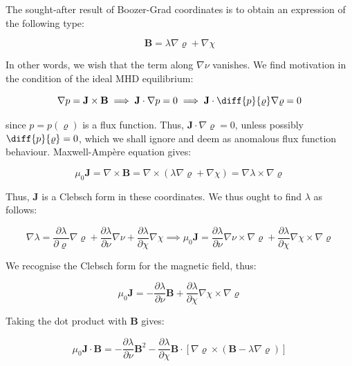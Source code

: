 The sought-after result of Boozer-Grad coordinates is to obtain an expression of the following type:

\begin{equation}
    \mathbf{B}=\lambda\nabla\varrho+\nabla\chi
\end{equation}

In other words, we wish that the term along $\nabla\nu$ vanishes. We find motivation in the condition of the ideal MHD equilibrium:

\begin{equation}
    \nabla p=\mathbf{J}\times\mathbf{B}\implies\mathbf{J}\cdot\nabla p=0\implies\mathbf{J}\cdot\diff{p}{\varrho}\nabla\varrho=0
\end{equation}

since $p=p(\varrho)$ is a flux function. Thus, $\mathbf{J}\cdot\nabla\varrho=0$, unless possibly $\diff{p}{\varrho}=0$, which we shall ignore and deem as anomalous flux function behaviour. Maxwell-Ampère equation gives:

\begin{equation}
    \mu_0\mathbf{J}=\nabla\times\mathbf{B}=\nabla\times\left(\lambda\nabla\varrho+\nabla\chi\right)=\nabla\lambda\times\nabla\varrho
\end{equation}

Thus, $\mathbf{J}$ is a Clebsch form in these coordinates. We thus ought to find $\lambda$ as follows:

\begin{equation}
    \nabla\lambda=\frac{\partial\lambda}{\partial\varrho}\nabla\varrho+\frac{\partial\lambda}{\partial\nu}\nabla\nu+\frac{\partial\lambda}{\partial\chi}\nabla\chi\implies\mu_0\mathbf{J}=\frac{\partial\lambda}{\partial\nu}\nabla\nu\times\nabla\varrho+\frac{\partial\lambda}{\partial\chi}\nabla\chi\times\nabla\varrho
\end{equation}

We recognise the Clebsch form for the magnetic field, thus:

\begin{equation}
    \label{eq-5-106}
    \mu_0\mathbf{J}=-\frac{\partial\lambda}{\partial\nu}\mathbf{B}+\frac{\partial\lambda}{\partial\chi}\nabla\chi\times\nabla\varrho
\end{equation}

Taking the dot product with $\mathbf{B}$ gives:

\begin{equation}
    \mu_0\mathbf{J}\cdot\mathbf{B}=-\frac{\partial\lambda}{\partial\nu}\mathbf{B}^2-\frac{\partial\lambda}{\partial\chi}\mathbf{B}\cdot\left[\nabla\varrho\times\left(\mathbf{B}-\lambda\nabla\varrho\right)\right]
\end{equation}

